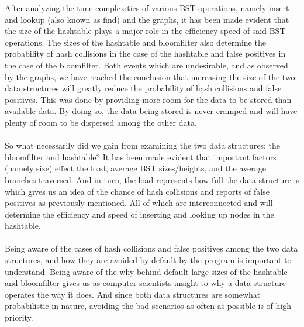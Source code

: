 \documentclass[
	12pt, %
]{fphw}
\begin{document}
\hspace{15pt} After analyzing the time complexities of various BST operations, namely insert and lookup (also known as find) and the graphs, it has been made evident that the size of the hashtable plays a major role in the efficiency speed of said BST operations. The sizes of the hashtable and bloomfilter also determine the probability of hash collisions in the case of the hashtable and false positives in the case of the bloomfilter. Both events which are undesirable, and as observed by the graphs, we have reached the conclusion that increasing the size of the two data structures will greatly reduce the probability of hash collisions and false positives. This was done by providing more room for the data to be stored than available data. By doing so, the data being stored is never cramped and will have plenty of room to be dispersed among the other data. \\
\\
So what necessarily did we gain from examining the two data structures: the bloomfilter and hashtable? It has been made evident that important factors (namely size) effect the load, average BST sizes/heights, and the average branches traversed. And in turn, the load represents how full the data structure is which gives us an idea of the chance of hash collisions and reports of false positives as previously mentioned. All of which are interconnected and will determine the efficiency and speed of inserting and looking up nodes in the hashtable. \\
\\
Being aware of the cases of hash collisions and false positives among the two data structures, and how they are avoided by default by the program is important to understand. Being aware of the why behind default large sizes of the hashtable and bloomfilter gives us as computer scientists insight to why a data structure operates the way it does. And since both data structures are somewhat probabilistic in nature, avoiding the bad scenarios as often as possible is of high priority.


\end{document}

